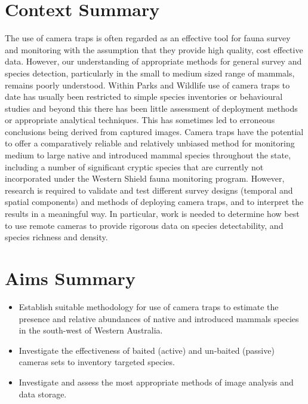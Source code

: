 \documentclass[version=last, paper=a4, DIV=18, usenames, dvipsnames]{scrartcl}
\begin{document}
%

%




\section*{Context Summary}
The use of camera traps is often regarded as an effective tool for fauna
survey and monitoring with the assumption that they provide high
quality, cost effective data. However, our understanding of appropriate
methods for general survey and species detection, particularly in the
small to medium sized range of mammals, remains poorly understood.
Within Parks and Wildlife use of camera traps to date has usually been
restricted to simple species inventories or behavioural studies and
beyond this there has been little assessment of deployment methods or
appropriate analytical techniques. This has sometimes led to erroneous
conclusions being derived from captured images. Camera traps have the
potential to offer a comparatively reliable and relatively unbiased
method for monitoring medium to large native and introduced mammal
species throughout the state, including a number of significant cryptic
species that are currently not incorporated under the Western Shield
fauna monitoring program. However, research is required to validate and
test different survey designs (temporal and spatial components) and
methods of deploying camera traps, and to interpret the results in a
meaningful way. In particular, work is needed to determine how best to
use remote cameras to provide rigorous data on species detectability,
and species richness and density.



\section*{Aims Summary}
\begin{itemize}
\itemsep1pt\parskip0pt
\item
  Establish suitable methodology for use of camera traps to estimate the
  presence and relative abundances of native and introduced mammals
  species in the south-west of Western Australia.
\item
  Investigate the effectiveness of baited (active) and un-baited
  (passive) cameras sets to inventory targeted species.
\item
  Investigate and assess the most appropriate methods of image analysis
  and data storage.
\end{itemize}
\end{document}

